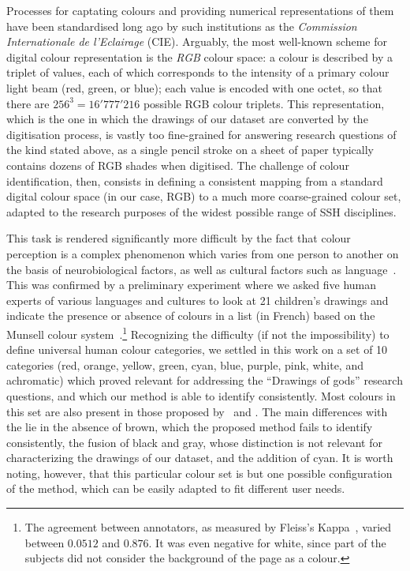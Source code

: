 \documentclass[11pt,a4paper]{article}
\begin{document}

Processes for captating colours and providing numerical representations of them have been standardised long ago by such institutions as the  \textit{Commission Internationale de l'Eclairage} (CIE). Arguably, the most well-known scheme for digital colour representation is the {\em RGB} colour space: a colour is described by a triplet of values, each of which corresponds to the intensity of a primary colour light beam (red, green, or blue); each value is encoded with one octet, so that there are $256^3 = 16'777'216$ possible RGB colour triplets. This representation, which is the one in which the drawings of our dataset are converted by the digitisation process, is vastly too fine-grained for answering research questions of the kind stated above, as a single pencil stroke on a sheet of paper typically contains dozens of RGB shades when digitised. The challenge of colour identification, then, consists in defining a consistent mapping from a standard digital colour space (in our case, RGB) to a much more coarse-grained colour set, adapted to the research purposes of the widest possible range of SSH disciplines.

This task is rendered significantly more difficult by the fact that colour perception is a complex phenomenon which varies from one person to another on the basis of neurobiological factors, as well as cultural factors such as language~\cite[][pp. 35 and 87]{pastoureau2017}. This was confirmed by a preliminary experiment where we asked five human experts of various languages and cultures to look at 21 children's drawings and indicate the presence or absence of colours in a list (in French) based on the Munsell colour system~\cite{Munsell1912}.\footnote{The agreement between annotators, as measured by Fleiss's Kappa~\cite{Fleiss1971}, varied between $0.0512$ and $0.876$. It was even negative for white, since part of the subjects did not consider the background of the page as a colour.} Recognizing the difficulty (if not the impossibility) to define universal human colour categories, we settled in this work on a set of 10 categories (red, orange, yellow, green, cyan, blue, purple, pink, white, and achromatic) which proved relevant for addressing the ``Drawings of gods'' research questions, and which our method is able to identify consistently. Most colours in this set are also present in those proposed by~\citet{berlinkay1969} and \citet{pastoureau2017}. The main differences with the lie in the absence of brown, which the proposed method fails to identify consistently, the fusion of black and gray, whose distinction is not relevant for characterizing the drawings of our dataset, and the addition of cyan. It is worth noting, however, that this particular colour set is but one possible configuration of the method, which can be easily adapted to fit different user needs.
\end{document}
